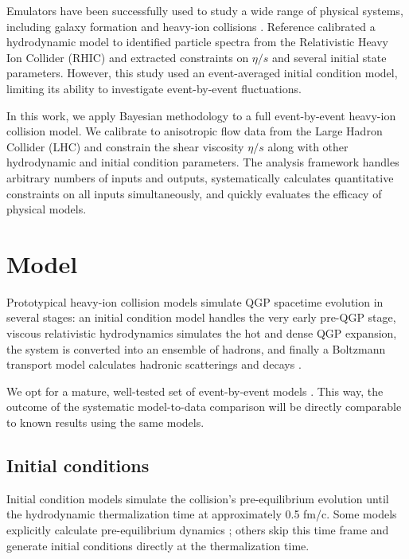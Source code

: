 \documentclass[aps,prc,reprint,amsmath]{revtex4-1}
\begin{document}
Emulators have been successfully used to study a wide range of physical systems, including galaxy formation \cite{Gomez:2012ak} and heavy-ion collisions \cite{Novak:2013bqa}.
Reference \cite{Novak:2013bqa} calibrated a hydrodynamic model to identified particle spectra from the Relativistic Heavy Ion Collider (RHIC) and extracted constraints on $\eta/s$ and several initial state parameters.
However, this study used an event-averaged initial condition model, limiting its ability to investigate event-by-event fluctuations.

In this work, we apply Bayesian methodology to a full event-by-event heavy-ion collision model.
We calibrate to anisotropic flow data from the Large Hadron Collider (LHC) and constrain the shear viscosity $\eta/s$ along with other hydrodynamic and initial condition parameters.
The analysis framework handles arbitrary numbers of inputs and outputs, systematically calculates quantitative constraints on all inputs simultaneously, and quickly evaluates the efficacy of physical models.


\section{Model}

Prototypical heavy-ion collision models simulate QGP spacetime evolution in several stages:
an initial condition model handles the very early pre-QGP stage, viscous relativistic hydrodynamics simulates the hot and dense QGP expansion, the system is converted into an ensemble of hadrons, and finally a Boltzmann transport model calculates hadronic scatterings and decays \cite{Bass:2000ib,Nonaka:2006yn,Song:2010mg}.

We opt for a mature, well-tested set of event-by-event models \cite{Shen:2014vra}.
This way, the outcome of the systematic model-to-data comparison will be directly comparable to known results using the same models.

\subsection{Initial conditions}

Initial condition models simulate the collision's pre-equilibrium evolution until the hydrodynamic thermalization time at approximately 0.5 fm/c.
Some models explicitly calculate pre-equilibrium dynamics \cite{}; others skip this time frame and generate initial conditions directly at the thermalization time.
\end{document}
